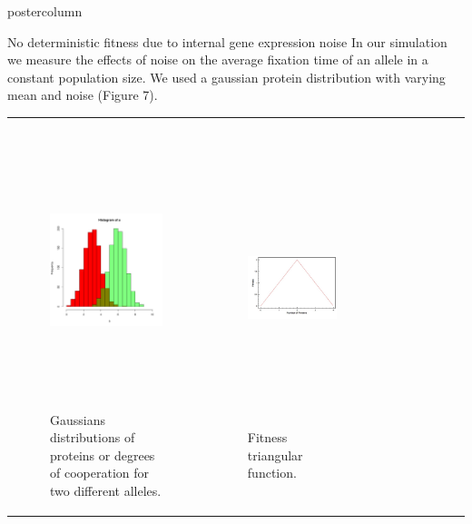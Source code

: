 \documentclass[final,hyperref={pdfpagelabels=false}]{beamer}
\begin{document}
\begin{frame}
\begin{columns}
\begin{column}{.49\textwidth}
\begin{beamercolorbox}[center,wd=\textwidth]{postercolumn}
\begin{minipage}[T]{.95\textwidth}
{\begin{block}{No deterministic fitness due to internal gene expression noise}
In our simulation we measure the effects of noise on the average fixation time of an allele in a constant population size. We  used a gaussian protein distribution with varying mean and noise (Figure 7).
\begin{tabularx}{\linewidth}{ZZZ}
\begin{figure}
\includegraphics[width=11cm,height=8cm]{images/Rplots.pdf}
\caption{Gaussians distributions of proteins or degrees of cooperation for two different alleles.}
\end{figure}
&
\begin{figure}
\includegraphics[width=11cm,height=8cm]{images/TriangularFunction.jpg}
\caption{Fitness triangular function.}
\end{figure}
&
\begin{figure}

\end{figure}
\end{tabularx}
\end{block}}
\end{minipage}
\end{beamercolorbox}
\end{column}
\end{columns}
\end{frame}
\end{document}
